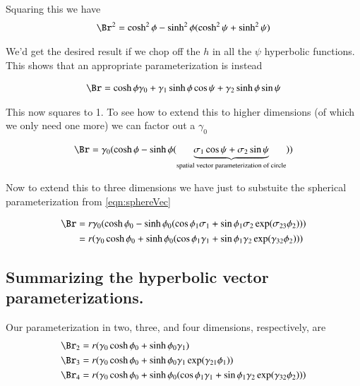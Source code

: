 \documentclass{article}
\begin{document}
Squaring this we have
\begin{align*}
\Br^2
&= \cosh^2 \phi - \sinh^2\phi (\cosh^2 \psi + \sinh^2\psi) \\
\end{align*}

We'd get the desired result if we chop off the $h$ in all the $\psi$ hyperbolic functions.  This
shows that an appropriate parameterization is instead

\begin{align*}
\Br 
&= \cosh \phi \gamma_0 + \gamma_1 \sinh\phi \cos\psi + \gamma_2 \sinh\phi \sin\psi \\
\end{align*}

This now squares to 1.  To see how to extend this to higher dimensions (of which we only need one more)
we can factor out a $\gamma_0$

\begin{align*}
\Br 
&= \gamma_0 (\cosh \phi - \sinh\phi (\underbrace{\sigma_1 \cos\psi + \sigma_2 \sin\psi}_{\text{spatial vector parameterization of circle}}) ) \\
\end{align*}

Now to extend this to three dimensions we have just to substuite the spherical parameterization from \ref{eqn:sphereVec}

\begin{align*}
\Br 
&= r \gamma_0 (\cosh \phi_0 - \sinh\phi_0 ( \cos\phi_1 \sigma_1 + \sin\phi_1 \sigma_2 \exp( \sigma_{23} \phi_2 )) ) \\
&= r (\gamma_0 \cosh \phi_0 + \sinh\phi_0 ( \cos\phi_1 \gamma_1 + \sin\phi_1 \gamma_2 \exp( \gamma_{32} \phi_2 )) ) \\
\end{align*}

\subsection{ Summarizing the hyperbolic vector parameterizations. }

Our parameterization in two, three, and four dimensions, respectively, are
\begin{align*}
\Br_2 &= r (\gamma_0 \cosh \phi_0 + \sinh\phi_0 \gamma_1) \\
\Br_3 &= r (\gamma_0 \cosh \phi_0 + \sinh\phi_0 \gamma_1 \exp( \gamma_{21} \phi_1 ) ) \\
\Br_4 &= r (\gamma_0 \cosh \phi_0 + \sinh\phi_0 ( \cos\phi_1 \gamma_1 + \sin\phi_1 \gamma_2 \exp( \gamma_{32} \phi_2 )) )
\end{align*}
\end{document}
